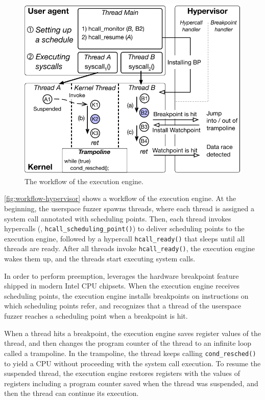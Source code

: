 %
\begin{figure}[t]
  \centering
  \includegraphics[width=0.9\linewidth]{fig/workflow-hypervisor.pdf}
  \caption{The workflow of the execution engine. }
  \label{fig:workflow-hypervisor}
\end{figure}
%
\autoref{fig:workflow-hypervisor} shows a workflow of the execution
engine.
%
At the beginning, the userspace fuzzer spawns threads, where each
thread is assigned a system call annotated with scheduling points.
%
Then, each thread invokes hypercalls (\ie,
\texttt{hcall_scheduling_point()}) to deliver scheduling points to the
execution engine, followed by a hypercall \texttt{hcall_ready()} that
sleeps until all threads are ready.
%
After all threads invoke \texttt{hcall_ready()}, the execution engine
wakes them up, and the threads start executing system calls.


\dr{}



%
In order to perform preemption, \sys leverages the hardware breakpoint
feature~\cite{hwbp} shipped in modern Intel CPU chipsets.
%
When the execution engine receives scheduling points, the execution
engine installs breakpoints on instructions on which scheduling points
refer, and recognizes that a thread of the userspace fuzzer reaches a
scheduling point when a breakpoint is hit.


When a thread hits a breakpoint, the execution engine saves register
values of the thread, and then changes the program counter of the
thread to an infinite loop called a trampoline.
%
In the trampoline, the thread keeps calling \texttt{cond_resched()} to
yield a CPU without proceeding with the system call execution.
%
To resume the suspended thread, the execution engine restores
registers with the values of registers including a program counter
saved when the thread was suspended, and then the thread can continue
its execution.


